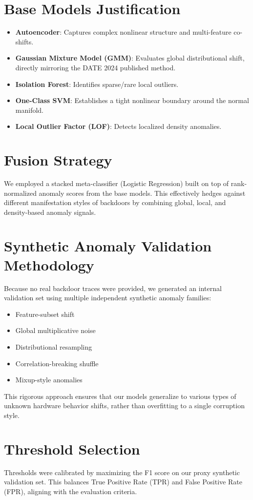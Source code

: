 \documentclass[11pt,a4paper]{article}
\begin{document}
\section{Base Models Justification}
\begin{itemize}
    \item \textbf{Autoencoder}: Captures complex nonlinear structure and multi-feature co-shifts.
    \item \textbf{Gaussian Mixture Model (GMM)}: Evaluates global distributional shift, directly mirroring the DATE 2024 published method.
    \item \textbf{Isolation Forest}: Identifies sparse/rare local outliers.
    \item \textbf{One-Class SVM}: Establishes a tight nonlinear boundary around the normal manifold.
    \item \textbf{Local Outlier Factor (LOF)}: Detects localized density anomalies.
\end{itemize}

\section{Fusion Strategy}
We employed a stacked meta-classifier (Logistic Regression) built on top of rank-normalized anomaly scores from the base models. This effectively hedges against different manifestation styles of backdoors by combining global, local, and density-based anomaly signals.

\section{Synthetic Anomaly Validation Methodology}
Because no real backdoor traces were provided, we generated an internal validation set using multiple independent synthetic anomaly families:
\begin{itemize}
    \item Feature-subset shift
    \item Global multiplicative noise
    \item Distributional resampling
    \item Correlation-breaking shuffle
    \item Mixup-style anomalies
\end{itemize}
This rigorous approach ensures that our models generalize to various types of unknown hardware behavior shifts, rather than overfitting to a single corruption style.

\section{Threshold Selection}
Thresholds were calibrated by maximizing the F1 score on our proxy synthetic validation set. This balances True Positive Rate (TPR) and False Positive Rate (FPR), aligning with the evaluation criteria.
\end{document}
